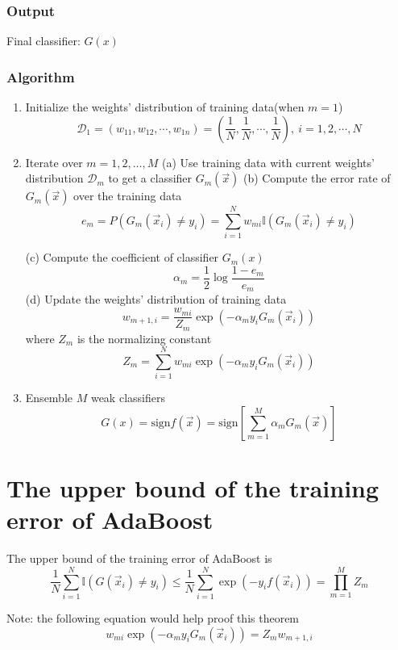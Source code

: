 \subsubsection{Output}
Final classifier: $G(x)$


\subsubsection{Algorithm}
\begin{enumerate}
\item Initialize the weights' distribution of training data(when $m=1$)
\begin{equation}\nonumber
\mathcal{D}_1=(w_{11},w_{12},\cdots,w_{1n})=(\frac{1}{N},\frac{1}{N},\cdots,\frac{1}{N}),\ i=1,2,\cdots,N
\end{equation}
\item Iterate over $m=1,2,\dotsc,M$
\subitem (a) Use training data with current weights' distribution $\mathcal{D}_m$ to get a classifier $G_m(\vec{x})$
\subitem (b) Compute the error rate of $G_m(\vec{x})$ over the training data \\
\begin{equation}
e_m=P(G_m(\vec{x}_i)\neq y_i)=\sum_{i=1}^N {w_{mi}\mathbb{I}(G_m(\vec{x}_i) \neq y_i)}
\end{equation}

\subitem (c) Compute the coefficient of classifier $G_m(x)$
\begin{equation}
\alpha_m = \frac{1}{2}\log{\frac{1-e_m}{e_m}}
\end{equation}
\subitem (d) Update the weights' distribution of training data
\begin{equation}
w_{m+1,i}=\frac{w_{mi}}{Z_m}\exp(-\alpha_m y_i G_m(\vec{x}_i))
\end{equation}
where $Z_m$ is the normalizing constant
\begin{equation}
Z_m=\sum_{i=1}^N w_{mi}\exp(-\alpha_m y_i G_m(\vec{x}_i))
\end{equation}

\item Ensemble $M$ weak classifiers
\begin{equation}
G(x)=\text{sign}f(\vec{x})=\text{sign}\left[\sum_{m=1}^M \alpha_m G_m(\vec{x})\right]
\end{equation}
\end{enumerate} 

\section{The upper bound of the training error of AdaBoost}
\begin{theorem}
The upper bound of the training error of AdaBoost is 
\begin{equation}
\frac{1}{N} \sum_{i=1}^N \mathbb{I}(G(\vec{x}_i)\neq y_i) \leq \frac{1}{N} \sum_{i=1}^N \exp(-y_i f(\vec{x}_i))=\prod_{m=1}^M Z_m
\end{equation}

Note: the following equation would help proof this theorem
\begin{equation}
w_{mi}\exp(-\alpha_m y_i G_m(\vec{x}_i))=Z_m w_{m+1,i}
\end{equation}
\end{theorem}
